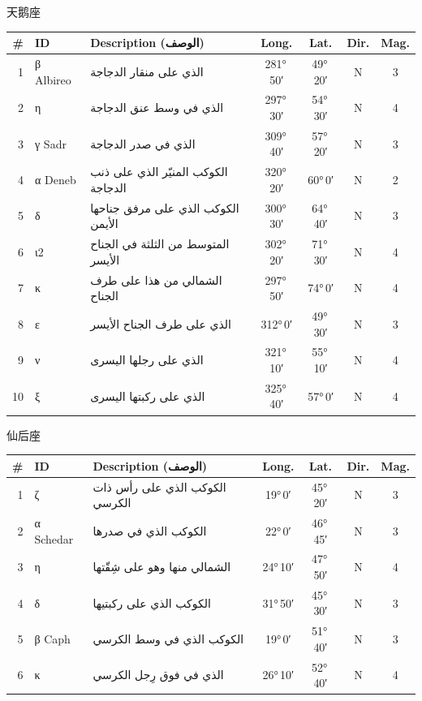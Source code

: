 \documentclass[9pt,a4paper]{extarticle}
\newcommand{\ar}[1]{{\arabicfont\textarabic{#1}}}
\begin{document}
\vspace{4pt}\quad\ar{الدجاجة}\quad 天鹅座
\begin{longtable}{r l >{\raggedright\arraybackslash}p{6.7cm} c c c c}
\toprule \# & ID & Description (\ar{الوصف}) & Long. & Lat. & Dir. & Mag.\\ \midrule\endhead
1 & β Albireo & \ar{الذي على منقار الدجاجة} & 281°\,50′ & 49°\,20′ & N & 3\\
2 & η & \ar{الذي في وسط عنق الدجاجة} & 297°\,30′ & 54°\,30′ & N & 4\\
3 & γ Sadr & \ar{الذي في صدر الدجاجة} & 309°\,40′ & 57°\,20′ & N & 3\\
4 & α Deneb & \ar{الكوكب المنيّر الذي على ذنب الدجاجة} & 320°\,20′ & 60°\,0′ & N & 2\\
5 & δ & \ar{الكوكب الذي على مرفق جناحها الأيمن} & 300°\,30′ & 64°\,40′ & N & 3\\
6 & ι2 & \ar{المتوسط من الثلثة في الجناح الأيسر} & 302°\,20′ & 71°\,30′ & N & 4\\
7 & κ & \ar{الشمالي من هذا على طرف الجناح} & 297°\,50′ & 74°\,0′ & N & 4\\
8 & ε & \ar{الذي على طرف الجناح الأيسر} & 312°\,0′ & 49°\,30′ & N & 3\\
9 & ν & \ar{الذي على رجلها اليسرى} & 321°\,10′ & 55°\,10′ & N & 4\\
10 & ξ & \ar{الذي على ركبتها اليسرى} & 325°\,40′ & 57°\,0′ & N & 4\\
\bottomrule\end{longtable}
\vspace{4pt}\quad\ar{ذات الكرسي}\quad 仙后座
\begin{longtable}{r l >{\raggedright\arraybackslash}p{6.7cm} c c c c}
\toprule \# & ID & Description (\ar{الوصف}) & Long. & Lat. & Dir. & Mag.\\ \midrule\endhead
1 & ζ & \ar{الكوكب الذي على رأس ذات الكرسي} & 19°\,0′ & 45°\,20′ & N & 3\\
2 & α Schedar & \ar{الكوكب الذي في صدرها} & 22°\,0′ & 46°\,45′ & N & 3\\
3 & η & \ar{الشمالي منها وهو على شِقّتها} & 24°\,10′ & 47°\,50′ & N & 4\\
4 & δ & \ar{الكوكب الذي على ركبتيها} & 31°\,50′ & 45°\,30′ & N & 3\\
5 & β Caph & \ar{الكوكب الذي في وسط الكرسي} & 19°\,0′ & 51°\,40′ & N & 3\\
6 & κ & \ar{الذي في فوق رِجل الكرسي} & 26°\,10′ & 52°\,40′ & N & 4\\
\bottomrule\end{longtable}
\end{document}
